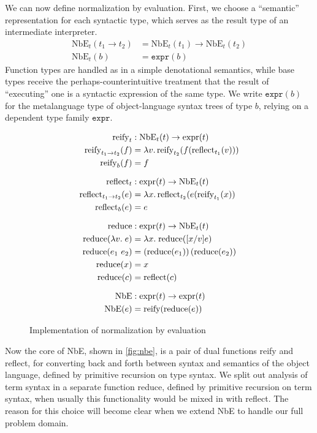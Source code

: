 \documentclass[sigplan,10pt,review,anonymous]{acmart}\settopmatter{printfolios=true,printccs=false,printacmref=false}
\newcommand{\defeq}{=}
\begin{document}
We can now define normalization by evaluation.
First, we choose a ``semantic'' representation for each syntactic type, which serves as the result type of an intermediate interpreter.
\begin{align*}
  \text{NbE}_t(t_1 \to t_2) & \defeq \text{NbE}_t(t_1) \to \text{NbE}_t(t_2) \\
  \text{NbE}_t(b) & \defeq \texttt{expr}(b)
\end{align*}
Function types are handled as in a simple denotational semantics, while base types receive the perhaps-counterintuitive treatment that the result of ``executing'' one is a syntactic expression of the same type.
We write $\texttt{expr}(b)$ for the metalanguage type of object-language syntax trees of type $b$, relying on a dependent type family $\texttt{expr}$.

\begin{figure}
\begin{align*}
  \text{reify}_t & : \text{NbE}_t(t) \to \text{expr}(t) \\
  \text{reify}_{t_1 \to t_2}(f) & \defeq \lambda v.\,\text{reify}_{t_2}(f(\text{reflect}_{t_1}(v))) \\
  \text{reify}_{b}(f) & \defeq f \\ \noalign{\vskip7pt}
  \text{reflect}_t & : \text{expr}(t) \to \text{NbE}_t(t) \\
  \text{reflect}_{t_1\to t_2}(e) & \defeq \lambda x.\,\text{reflect}_{t_2}(e(\text{reify}_{t_1}(x)) \\
  \text{reflect}_{b}(e) & \defeq e \\ \noalign{\vskip7pt}
  \text{reduce} & : \text{expr}(t) \to \text{NbE}_t(t) \\
  \text{reduce}(\lambda v. \; e) & \defeq \lambda x. \; \text{reduce}([x/v]e) \\
  \text{reduce}(e_1~e_2) & \defeq \left(\text{reduce}(e_1)\right)(\text{reduce}(e_2)) \\
  \text{reduce}(x) & \defeq x \\
  \text{reduce}(c) & \defeq \text{reflect}(c) \\ \noalign{\vskip7pt}
  \text{NbE} & : \text{expr}(t) \to \text{expr}(t) \\
  \text{NbE}(e) & \defeq \text{reify}(\text{reduce}(e))
\end{align*}
\caption{\label{fig:nbe}Implementation of normalization by evaluation}
\end{figure}

Now the core of NbE, shown in \autoref{fig:nbe}, is a pair of dual functions reify and reflect, for converting back and forth between syntax and semantics of the object language, defined by primitive recursion on type syntax.
We split out analysis of term syntax in a separate function reduce, defined by primitive recursion on term syntax, when usually this functionality would be mixed in with reflect.
The reason for this choice will become clear when we extend NbE to handle our full problem domain.
\end{document}
